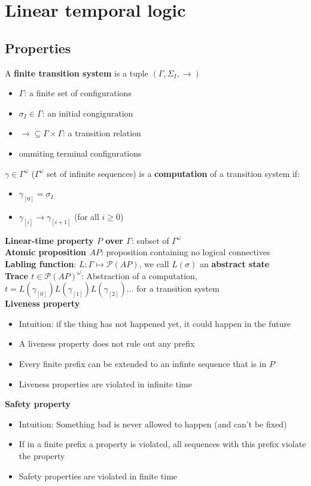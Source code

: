 \documentclass{article}
\def\li{\rightarrow}
\def\P{\mathcal{P}}
\begin{document}
\section{Linear temporal logic}
\subsection{Properties}
A \textbf{finite transition system} is a tuple $(\Gamma, \Sigma_I, \li)$
\begin{itemize}
    \item $\Gamma$: a finite set of configurations
    \item $\sigma_I\in \Gamma$: an initial congiguration
    \item $\li \subseteq \Gamma \times \Gamma$: a transition relation
    \item ommiting terminal configurations
\end{itemize} \smallskip
$\gamma \in \Gamma^\omega$ ($\Gamma^\omega$ set of infinite sequences) is a \textbf{computation} of a transition system if:
\begin{itemize}
    \item $\gamma_{[0]}=\sigma_I$
    \item $\gamma_{[i]} \li \gamma_{[i+1]}$ (for all $i \geq 0$)
\end{itemize} \smallskip
\textbf{Linear-time property $P$ over $\Gamma$}: subset of $\Gamma^\omega$ \smallskip \\
\textbf{Atomic proposition $AP$}: proposition containing no logical connectives \smallskip \\
\textbf{Labling function}: $L:\Gamma \mapsto \P(AP)$, we call $L(\sigma)$ an \textbf{abstract state} \smallskip \\
\textbf{Trace $t\in \P(AP)^\omega$}: Abstraction of a computation, $t = L(\gamma_{[0]})L(\gamma_{[1]})L(\gamma_{[2]})...$ for a transition system \smallskip \\
\textbf{Liveness property} \begin{itemize}
    \item Intuition: if the thing has not happened yet, it could happen in the future
    \item A liveness property does not rule out any prefix
    \item Every finite prefix can be extended to an infinte sequence that is in $P$
    \item Liveness properties are violated in infinite time
\end{itemize} \smallskip
\textbf{Safety property} \begin{itemize}
    \item Intuition: Something bad is never allowed to happen (and can't be fixed)
    \item If in a finite prefix a property is violated, all sequences with this prefix violate the property
    \item Safety properties are violated in finite time
\end{itemize} \smallskip
\end{document}
